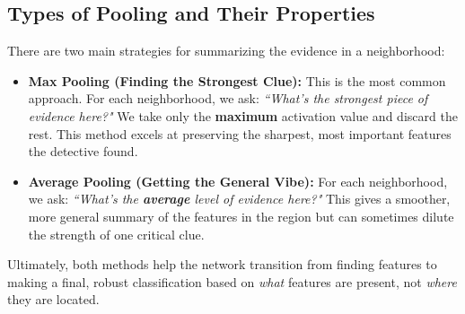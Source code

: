 \documentclass{article}
\begin{document}
\subsection{Types of Pooling and Their Properties}
There are two main strategies for summarizing the evidence in a neighborhood:

\begin{itemize}
    \item \textbf{Max Pooling (Finding the Strongest Clue):} This is the most common approach. For each neighborhood, we ask: \textit{``What's the strongest piece of evidence here?"} We take only the \textbf{maximum} activation value and discard the rest. This method excels at preserving the sharpest, most important features the detective found.

    \item \textbf{Average Pooling (Getting the General Vibe):} For each neighborhood, we ask: \textit{``What's the \textbf{average} level of evidence here?"} This gives a smoother, more general summary of the features in the region but can sometimes dilute the strength of one critical clue.
\end{itemize}

Ultimately, both methods help the network transition from finding features to making a final, robust classification based on \textit{what} features are present, not \textit{where} they are located.
\end{document}
